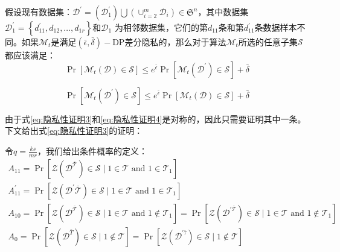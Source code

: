 假设现有数据集：$\mathcal{D}^{\prime}=\left(\mathcal{D}_{1}^{\prime}\right) \bigcup\left(\cup_{i=2}^{m} \mathcal{D}_{i}\right) \in \mathfrak{S}^{n}$，其中数据集$\mathcal{D}_{1}^{\prime}=\left\{d_{11}^{\prime}, d_{12}, \ldots, d_{1 r}\right\}$和$\mathcal{D}_{1}$ 为相邻数据集，它们的第$d_{11}$条和第$d_{11}^{\prime}$条数据样本不同。如果$\mathcal{M}_{t}$是满足$(\bar{\epsilon}, \bar{\delta})-\mathrm{DP}$差分隐私的，那么对于算法$\mathcal{M}_{t}$所选的任意子集$\mathcal{S}$ 都应该满足：
\begin{equation}\label{eq:隐私性证明3}
\operatorname{Pr}\left[\mathcal{M}_{t}(\mathcal{D}) \in \mathcal{S}\right] \leq e^{\bar{\epsilon}} \operatorname{Pr}\left[\mathcal{M}_{t}\left(\mathcal{D}^{\prime}\right) \in \mathcal{S}\right]+\bar{\delta}
\end{equation}

\begin{equation}\label{eq:隐私性证明4}
\operatorname{Pr}\left[\mathcal{M}_{t}\left(\mathcal{D}^{\prime}\right) \in \mathcal{S}\right] \leq e^{\bar{\epsilon}} \operatorname{Pr}\left[\mathcal{M}_{t}(\mathcal{D}) \in \mathcal{S}\right]+\bar{\delta}
\end{equation}

由于式\ref{eq:隐私性证明3}和\ref{eq:隐私性证明4}是对称的，因此只需要证明其中一条。下文给出式\ref{eq:隐私性证明3}的证明：

令$q=\frac{k s}{m r}$，我们给出条件概率的定义：
\begin{equation}\label{eq:隐私性证明5}
\begin{array}{l}
A_{11}=\operatorname{Pr}\left[\mathcal{Z}\left(\mathcal{D}^{\overline{\mathcal{T}}}\right) \in \mathcal{S} \mid 1 \in \mathcal{T} \text { and } 1 \in \mathcal{T}_{1}\right] \\
A_{11}^{\prime}=\operatorname{Pr}\left[\mathcal{Z}\left(\mathcal{D}^{\prime} \overline{\mathcal{T}}\right) \in \mathcal{S} \mid 1 \in \mathcal{T} \text { and } 1 \in \mathcal{T}_{1}\right] \\
A_{10}=\operatorname{Pr}\left[\mathcal{Z}\left(\mathcal{D}^{\overline{\mathcal{T}}}\right) \in \mathcal{S} \mid 1 \in \mathcal{T} \text { and } 1 \notin \mathcal{T}_{1}\right]=\operatorname{Pr}\left[\mathcal{Z}\left(\mathcal{D}^{\prime \overline{\mathcal{T}}}\right) \in \mathcal{S} \mid 1 \in \mathcal{T} \text { and } 1 \notin \mathcal{T}_{1}\right] \\
A_{0}=\operatorname{Pr}\left[\mathcal{Z}\left(\mathcal{D}^{\bar{T}}\right) \in \mathcal{S} \mid 1 \notin \mathcal{T}\right]=\operatorname{Pr}\left[\mathcal{Z}\left(\mathcal{D}^{\prime \bar{\tau}}\right) \in \mathcal{S} \mid 1 \notin \mathcal{T}\right]
\end{array}
\end{equation}

